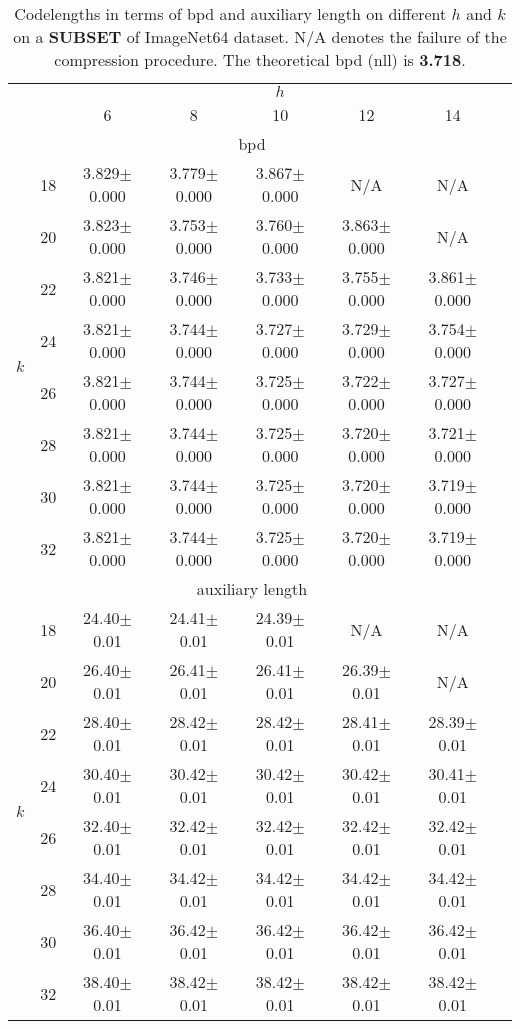 \documentclass{article}
\newcommand{\ebar}[1]{{\tiny $\pm$#1}}
\begin{document}
\begin{table}[ht]
\centering
\caption{Codelengths in terms of bpd and auxiliary length on different $h$ and $k$ on a \textbf{SUBSET} of ImageNet64 dataset. N/A denotes the failure of the compression procedure. The theoretical bpd (nll) is \textbf{3.718}.}
\small
\label{tab:hparam_img64}
\begin{tabular}{cccccccc}
\toprule
    & & \multicolumn{5}{c}{$h$} \\
     &  & 6 & 8 & 10 & 12 & 14 \\
    \midrule
    \multicolumn{7}{c}{bpd} \\
    \midrule
    \multirow{8}{*}{$k$} & 18 & 3.829\ebar{0.000} & 3.779\ebar{0.000} & 3.867\ebar{0.000} & N/A & N/A \\
        & 20 & 3.823\ebar{0.000} & 3.753\ebar{0.000} & 3.760\ebar{0.000} & 3.863\ebar{0.000} & N/A \\
        & 22 & 3.821\ebar{0.000} & 3.746\ebar{0.000} & 3.733\ebar{0.000} & 3.755\ebar{0.000} & 3.861\ebar{0.000} \\
        & 24 & 3.821\ebar{0.000} & 3.744\ebar{0.000} & 3.727\ebar{0.000} & 3.729\ebar{0.000} & 3.754\ebar{0.000} \\
        & 26 & 3.821\ebar{0.000} & 3.744\ebar{0.000} & 3.725\ebar{0.000} & 3.722\ebar{0.000} & 3.727\ebar{0.000} \\
        & 28 & 3.821\ebar{0.000} & 3.744\ebar{0.000} & 3.725\ebar{0.000} & 3.720\ebar{0.000} & 3.721\ebar{0.000} \\
        & 30 & 3.821\ebar{0.000} & 3.744\ebar{0.000} & 3.725\ebar{0.000} & 3.720\ebar{0.000} & 3.719\ebar{0.000} \\
        & 32 & 3.821\ebar{0.000} & 3.744\ebar{0.000} & 3.725\ebar{0.000} & 3.720\ebar{0.000} & 3.719\ebar{0.000} \\
    \midrule
    \multicolumn{7}{c}{auxiliary length} \\
    \midrule
    \multirow{8}{*}{$k$} & 18 & 24.40\ebar{0.01} & 24.41\ebar{0.01} & 24.39\ebar{0.01} & N/A & N/A \\
        & 20 & 26.40\ebar{0.01} & 26.41\ebar{0.01} & 26.41\ebar{0.01} & 26.39\ebar{0.01} & N/A \\
        & 22 & 28.40\ebar{0.01} & 28.42\ebar{0.01} & 28.42\ebar{0.01} & 28.41\ebar{0.01} & 28.39\ebar{0.01} \\
        & 24 & 30.40\ebar{0.01} & 30.42\ebar{0.01} & 30.42\ebar{0.01} & 30.42\ebar{0.01} & 30.41\ebar{0.01} \\
        & 26 & 32.40\ebar{0.01} & 32.42\ebar{0.01} & 32.42\ebar{0.01} & 32.42\ebar{0.01} & 32.42\ebar{0.01} \\
        & 28 & 34.40\ebar{0.01} & 34.42\ebar{0.01} & 34.42\ebar{0.01} & 34.42\ebar{0.01} & 34.42\ebar{0.01} \\
        & 30 & 36.40\ebar{0.01} & 36.42\ebar{0.01} & 36.42\ebar{0.01} & 36.42\ebar{0.01} & 36.42\ebar{0.01} \\
        & 32 & 38.40\ebar{0.01} & 38.42\ebar{0.01} & 38.42\ebar{0.01} & 38.42\ebar{0.01} & 38.42\ebar{0.01} \\
\bottomrule
\end{tabular}
\end{table}
\end{document}
